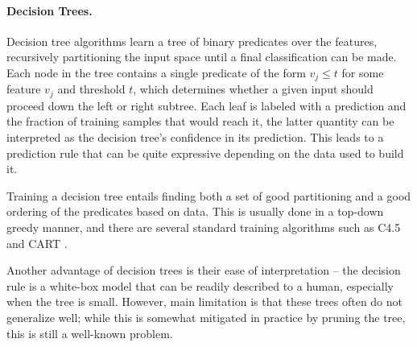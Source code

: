 %
%


\paragraph{Decision Trees.} Decision tree algorithms learn a tree of binary predicates over the features, recursively partitioning the input space until a final
classification can be made. Each node in the tree contains a single predicate of the form
$v_j \leq t$ for some feature $v_j$ and threshold $t$, which determines
whether a given input should proceed down the left or right subtree.
Each leaf is labeled with a prediction and the fraction of training
samples that would reach it, the latter quantity can be interpreted as
the decision tree's confidence in its prediction. This leads to a prediction rule
that can be quite expressive depending on the data used to build it. 

Training a decision tree entails finding both a set of good partitioning and a good ordering of the predicates based on data. This is usually done in a top-down greedy manner, and there are several standard training algorithms such as C4.5
\citep{Quinlan1993-de} and CART \citep{Breiman1984-qy}.

Another advantage of decision trees is their ease of interpretation --  the decision rule is a white-box model that can be readily described to a human, especially when the tree is small. However, main limitation is that these trees often do not generalize well; while this is somewhat mitigated in practice by pruning the tree, this is still a well-known problem.


%
%
%

